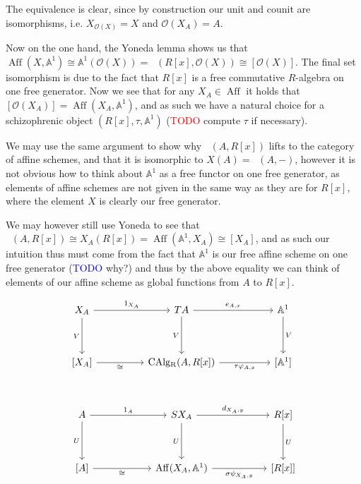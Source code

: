 \documentclass[12pt,a4paper]{article}
\DeclareMathOperator{\CAlg}{CAlg_R}
\DeclareMathOperator{\Aff}{Aff}
\begin{document}
The equivalence is clear, since by construction  our unit and counit are  isomorphisms, i.e. $X_{\mathcal{O}(X)} =X$ and $\mathcal{O}(X_A) = A$. 


Now on the one hand,  the Yoneda lemma shows us that   $\Aff(X, \mathbb{A}^1) \cong \mathbb{A}^1(\mathcal{O}(X)) = \CAlg(R[x], \mathcal{O}(X)) \cong [\mathcal{O}(X)]$. The final set isomorphism is due to the fact that $R[x]$ is a free commutative $R$-algebra on one free generator. Now we see that for any $X_A \in \Aff$ it holds that $[\mathcal{O}(X_A)] = \Aff(X_A, \mathbb{A}^1)$, and as such we have a natural choice for a schizophrenic object $(R[x], \tau, \mathbb{A}^1 )$ (\textcolor{red}{TODO} compute $\tau$ if necessary). 


We may use the same argument to show why $\CAlg(A, R[x])$ lifts to the category of affine schemes, and that it is isomorphic to $X(A) = \CAlg(A, -)$, however it is not obvious how to think about $\mathbb{A}^1$ as a free functor on one free generator, as elements of affine schemes are not given in the same way as they are for $R[x]$, where the element $X$ is clearly our free generator. 

We may however still use Yoneda to see that $\CAlg(A, R[x]) \cong X_A(R[x]) = \Aff(\mathbb{A}^1, X_A) \cong [X_A]$, and as such our intuition thus must come from the fact that $\mathbb{A}^1$ is our free affine scheme on one free generator (\textcolor{blue}{TODO} why?) and  thus by the above equality we can think of elements of our affine scheme  as global functions from $A$ to $R[x]$.

\[\begin{tikzcd}
	{X_A} && TA && {\mathbb{A}^1} \\
	\\
	{[X_A]} && {\CAlg(A, R[x])} && {[\mathbb{A}^1]} \\
	\\
	A && {SX_A} && {R[x]} \\
	\\
	{[A]} && {\Aff(X_A, \mathbb{A}^1)} && {[R[x]]}
	\arrow["{1_{X_A}}", from=1-1, to=1-3]
	\arrow["V"', from=1-1, to=3-1]
	\arrow["{e_{A,x}}", from=1-3, to=1-5]
	\arrow["V"', from=1-3, to=3-3]
	\arrow["V", from=1-5, to=3-5]
	\arrow["\cong"', from=3-1, to=3-3]
	\arrow["{\tau \varphi_{A, x}}"', from=3-3, to=3-5]
	\arrow["{1_A}", from=5-1, to=5-3]
	\arrow["U"', from=5-1, to=7-1]
	\arrow["{d_{X_A,y}}", from=5-3, to=5-5]
	\arrow["U"', from=5-3, to=7-3]
	\arrow["U", from=5-5, to=7-5]
	\arrow["\cong"', from=7-1, to=7-3]
	\arrow["{\sigma\psi_{X_A,y}}"', from=7-3, to=7-5]
\end{tikzcd}\]
\end{document}
